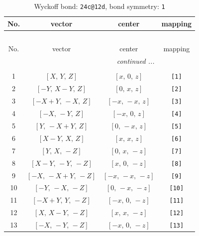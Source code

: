 \documentclass[fleqn,8pt]{jsarticle}
\begin{document}
\begin{longtable}{cccc}
\caption{Wyckoff bond: {\tt 24c@12d}, bond symmetry: {\tt 1}}
 \\
 \hline \hline
No. & vector & center & mapping \\ \hline \endfirsthead

\multicolumn{3}{l}{\tablename\ \thetable{}} \\
 \hline \hline
No. & vector & center & mapping \\ \hline \endhead

 \hline \hline
\multicolumn{3}{r}{\footnotesize\it continued ...} \\ \endfoot

 \hline \hline
\multicolumn{3}{r}{} \\ \endlastfoot

1 & $\left[ X,\, Y,\, Z \right]$ & $\left[ x,\, 0,\, z \right]$ & {\tt [1]} \\ \hline
2 & $\left[ - Y,\, X - Y,\, Z \right]$ & $\left[ 0,\, x,\, z \right]$ & {\tt [2]} \\ \hline
3 & $\left[ - X + Y,\, - X,\, Z \right]$ & $\left[ - x,\, - x,\, z \right]$ & {\tt [3]} \\ \hline
4 & $\left[ - X,\, - Y,\, Z \right]$ & $\left[ - x,\, 0,\, z \right]$ & {\tt [4]} \\ \hline
5 & $\left[ Y,\, - X + Y,\, Z \right]$ & $\left[ 0,\, - x,\, z \right]$ & {\tt [5]} \\ \hline
6 & $\left[ X - Y,\, X,\, Z \right]$ & $\left[ x,\, x,\, z \right]$ & {\tt [6]} \\ \hline
7 & $\left[ Y,\, X,\, - Z \right]$ & $\left[ 0,\, x,\, - z \right]$ & {\tt [7]} \\ \hline
8 & $\left[ X - Y,\, - Y,\, - Z \right]$ & $\left[ x,\, 0,\, - z \right]$ & {\tt [8]} \\ \hline
9 & $\left[ - X,\, - X + Y,\, - Z \right]$ & $\left[ - x,\, - x,\, - z \right]$ & {\tt [9]} \\ \hline
10 & $\left[ - Y,\, - X,\, - Z \right]$ & $\left[ 0,\, - x,\, - z \right]$ & {\tt [10]} \\ \hline
11 & $\left[ - X + Y,\, Y,\, - Z \right]$ & $\left[ - x,\, 0,\, - z \right]$ & {\tt [11]} \\ \hline
12 & $\left[ X,\, X - Y,\, - Z \right]$ & $\left[ x,\, x,\, - z \right]$ & {\tt [12]} \\ \hline
13 & $\left[ - X,\, - Y,\, - Z \right]$ & $\left[ - x,\, 0,\, - z \right]$ & {\tt [13]} \\ \hline

\end{longtable}
\end{document}
